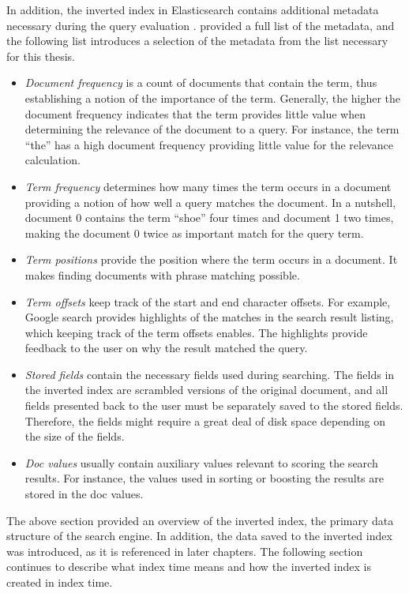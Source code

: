 In addition, the inverted index in Elasticsearch contains additional metadata necessary during the query evaluation
\cite{relevantSearch}. 
\citeauthor{relevantSearch} \cite{relevantSearch} provided a full list of the metadata, and
the following list introduces a selection of the metadata from the list necessary for this thesis.
\begin{itemize}
    \item \emph{Document frequency} is a count of documents that contain the term, thus 
    establishing a notion of the importance of the term. 
    Generally, the higher the document frequency indicates that the term provides little value when 
    determining the relevance of the document to a query.
    For instance, the term \enquote{the} has a high document frequency providing little value 
    for the relevance calculation.
    \item \emph{Term frequency} determines how many times the term occurs in a document
    providing a notion of how well a query matches the document.
    In a nutshell, document 0 contains the term \enquote{shoe} four times and document 1 two times,
    making the document 0 twice as important match for the query term.
    \item \emph{Term positions} provide the position where the term occurs in a document. 
    It makes finding documents with phrase matching possible.
    \item \emph{Term offsets} keep track of the start and end character offsets. 
    For example, Google search provides highlights of the matches in the search result listing,
    which keeping track of the term offsets enables.
    The highlights provide feedback to the user on why the result matched the query.
    \item \emph{Stored fields} contain the necessary fields used during searching. 
    The fields in the inverted index are scrambled versions of the original document, and all fields 
    presented back to the user must be separately saved to the stored fields.
    Therefore, the fields might require a great deal of disk space depending on the size of the fields.
    \item \emph{Doc values} usually contain auxiliary values relevant to scoring the search results.
    For instance, the values used in sorting or boosting the results are stored in the doc values.
\end{itemize}

The above section provided an overview of the inverted index, the primary data structure of the search engine.
In addition, the data saved to the inverted index was introduced, as it is referenced in later chapters.
The following section continues to describe what index time means and how the inverted index is 
created in index time.

